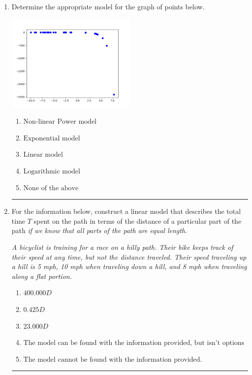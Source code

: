\documentclass[14pt]{extbook}
\newcommand{\litem}[1]{\item#1\hspace*{-1cm}\rule{\textwidth}{0.4pt}}
\begin{document}
\begin{enumerate}
{\begin{enumerate}[label=\Alph*.]
\end{enumerate} }
\litem{
Determine the appropriate model for the graph of points below.
\begin{center}
    \includegraphics[width=0.5\textwidth]{../Figures/identifyModelGraph12CopyB.png}
\end{center}
\begin{enumerate}[label=\Alph*.]
\item \( \text{Non-linear Power model} \)
\item \( \text{Exponential model} \)
\item \( \text{Linear model} \)
\item \( \text{Logarithmic model} \)
\item \( \text{None of the above} \)

\end{enumerate} }
\litem{
For the information below, construct a linear model that describes the total time $T$ spent on the path in terms of the distance of a particular part of the path \textit{if we know that all parts of the path are equal length}.
\begin{center}
    \textit{ A bicyclist is training for a race on a hilly path. Their bike keeps track of their speed at any time, but not the distance traveled. Their speed traveling up a hill is 5 mph, 10 mph when traveling down a hill, and 8 mph when traveling along a flat portion. }
\end{center}
\begin{enumerate}[label=\Alph*.]
\item \( 400.000 D \)
\item \( 0.425 D \)
\item \( 23.000 D \)
\item \( \text{The model can be found with the information provided, but isn't options 1-3.} \)
\item \( \text{The model cannot be found with the information provided.} \)


\end{enumerate}}
\end{enumerate}
\end{document}
